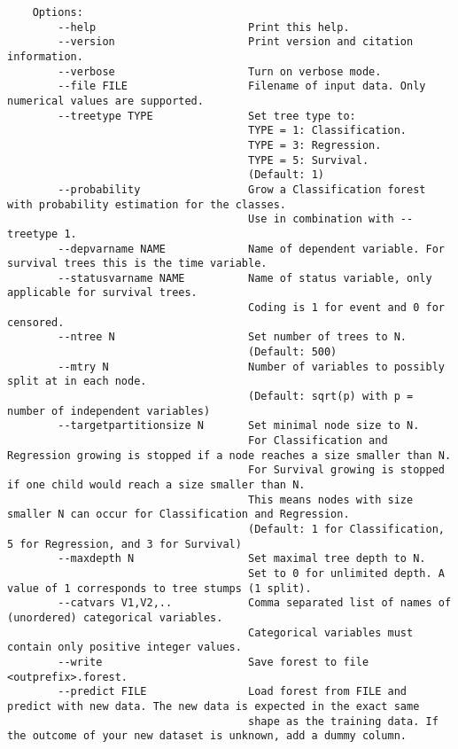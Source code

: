 \documentclass[12pt,oneside]{book}
\begin{document}
\begin{lstlisting}
    Options:
        --help                        Print this help.
        --version                     Print version and citation information.
        --verbose                     Turn on verbose mode.
        --file FILE                   Filename of input data. Only numerical values are supported.
        --treetype TYPE               Set tree type to:
                                      TYPE = 1: Classification.
                                      TYPE = 3: Regression.
                                      TYPE = 5: Survival.
                                      (Default: 1)
        --probability                 Grow a Classification forest with probability estimation for the classes.
                                      Use in combination with --treetype 1.
        --depvarname NAME             Name of dependent variable. For survival trees this is the time variable.
        --statusvarname NAME          Name of status variable, only applicable for survival trees.
                                      Coding is 1 for event and 0 for censored.
        --ntree N                     Set number of trees to N.
                                      (Default: 500)
        --mtry N                      Number of variables to possibly split at in each node.
                                      (Default: sqrt(p) with p = number of independent variables)
        --targetpartitionsize N       Set minimal node size to N.
                                      For Classification and Regression growing is stopped if a node reaches a size smaller than N.
                                      For Survival growing is stopped if one child would reach a size smaller than N.
                                      This means nodes with size smaller N can occur for Classification and Regression.
                                      (Default: 1 for Classification, 5 for Regression, and 3 for Survival)
        --maxdepth N                  Set maximal tree depth to N.
                                      Set to 0 for unlimited depth. A value of 1 corresponds to tree stumps (1 split).
        --catvars V1,V2,..            Comma separated list of names of (unordered) categorical variables. 
                                      Categorical variables must contain only positive integer values.
        --write                       Save forest to file <outprefix>.forest.
        --predict FILE                Load forest from FILE and predict with new data. The new data is expected in the exact same 
                                      shape as the training data. If the outcome of your new dataset is unknown, add a dummy column.

\end{lstlisting}
\end{document}
